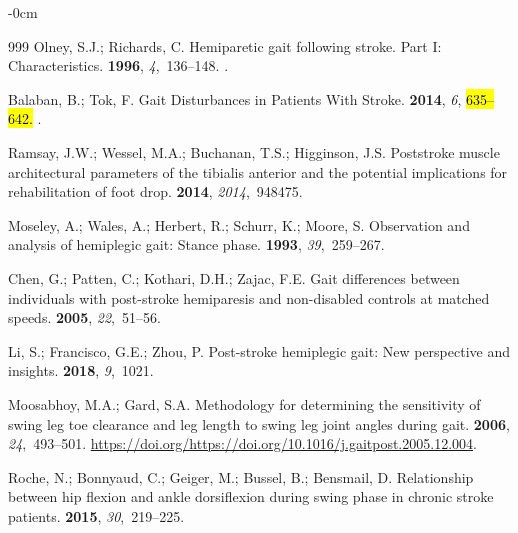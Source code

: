 \documentclass[actuators,article,accept,pdftex,moreauthors]{Definitions/mdpi}
\begin{document}
\begin{adjustwidth}{-\extralength}{0cm}
\begin{thebibliography}{999}
Olney, S.J.; Richards, C.
\newblock Hemiparetic gait following stroke. Part I: Characteristics.
 {\bf 1996}, {\em 4},~136--148.
.

Balaban, B.; Tok, F.
\newblock Gait Disturbances in Patients With Stroke.
  {\bf 2014}, {\em 6}, \hl{635--642.} %
.

Ramsay, J.W.; Wessel, M.A.; Buchanan, T.S.; Higginson, J.S.
\newblock Poststroke muscle architectural parameters of the tibialis anterior
  and the potential implications for rehabilitation of foot drop.
 {\bf 2014}, {\em 2014},~948475.

Moseley, A.; Wales, A.; Herbert, R.; Schurr, K.; Moore, S.
\newblock Observation and analysis of hemiplegic gait: Stance phase.
 {\bf 1993}, {\em
  39},~259--267.

Chen, G.; Patten, C.; Kothari, D.H.; Zajac, F.E.
\newblock Gait differences between individuals with post-stroke hemiparesis and
  non-disabled controls at matched speeds.
 {\bf 2005}, {\em 22},~51--56.

Li, S.; Francisco, G.E.; Zhou, P.
\newblock Post-stroke hemiplegic gait: New perspective and insights.
 {\bf 2018}, {\em 9},~1021.

Moosabhoy, M.A.; Gard, S.A.
\newblock Methodology for determining the sensitivity of swing leg toe
  clearance and leg length to swing leg joint angles during gait.
 {\bf 2006}, {\em 24},~493--501.
\newblock
  {\url{https://doi.org/https://doi.org/10.1016/j.gaitpost.2005.12.004}}.

Roche, N.; Bonnyaud, C.; Geiger, M.; Bussel, B.; Bensmail, D.
\newblock Relationship between hip flexion and ankle dorsiflexion during swing
  phase in chronic stroke patients.
 {\bf 2015}, {\em 30},~219--225.


\end{thebibliography}
\end{adjustwidth}
\end{document}
